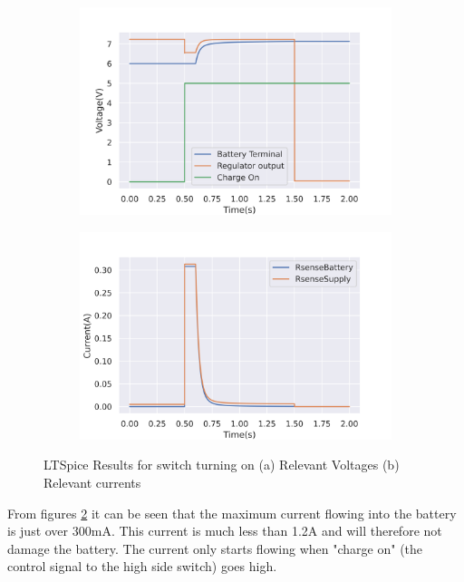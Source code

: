 \begin{figure}[!htb]
 \footnotesize
 \centering
    \begin{subfigure}[]{0.42\textwidth}
              \centering
  		\includegraphics[width=1\linewidth]{./Figures/A2-1.png}
		    \caption{} \label{subfig:A2-1}
     \end{subfigure}
     \begin{subfigure}[]{0.42\textwidth}
             \centering
  		\includegraphics[width=1\linewidth]{./Figures/A2-2.png}
		   \caption{ } \label{subfig:A2-2}
     \end{subfigure}
   \caption[{LTSPICE switch turning on results}]{LTSpice Results for switch turning on  (a)  Relevant Voltages (b)  Relevant currents  }
    \label{fig:spiceReg}
 \end{figure}

 From figures \ref{subfig:A2-2} it can be seen that the maximum current flowing into the battery is just over 300mA. This current is much less than 1.2A and will therefore not damage the battery. The current only starts flowing when "charge on" (the control signal to the high side switch) goes high.
 
